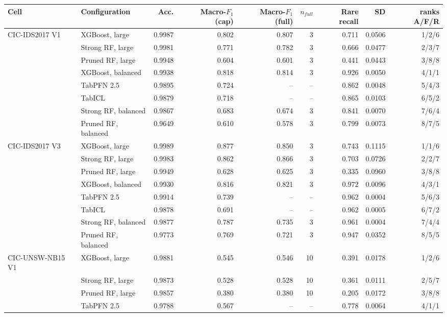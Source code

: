 \begin{tabular}{@{}llrrrrrrr@{}}
\toprule
Cell & Configuration & Acc. & Macro-$F_1$ (cap) & Macro-$F_1$ (full) & $n_{full}$ & Rare recall & SD & ranks A/F/R \\
\midrule
CIC-IDS2017 V1 & XGBoost, large & 0.9987 & 0.802 & 0.807 & 3 & 0.711 & 0.0506 & 1/2/6 \\
 & Strong RF, large & 0.9981 & 0.771 & 0.782 & 3 & 0.666 & 0.0477 & 2/3/7 \\
 & Pruned RF, large & 0.9948 & 0.604 & 0.601 & 3 & 0.441 & 0.0443 & 3/8/8 \\
 & XGBoost, balanced & 0.9938 & 0.818 & 0.814 & 3 & 0.926 & 0.0050 & 4/1/1 \\
 & TabPFN 2.5 & 0.9895 & 0.724 & -- & -- & 0.862 & 0.0048 & 5/4/3 \\
 & TabICL & 0.9879 & 0.718 & -- & -- & 0.865 & 0.0103 & 6/5/2 \\
 & Strong RF, balanced & 0.9867 & 0.683 & 0.674 & 3 & 0.841 & 0.0070 & 7/6/4 \\
 & Pruned RF, balanced & 0.9649 & 0.610 & 0.578 & 3 & 0.799 & 0.0073 & 8/7/5 \\
\addlinespace
CIC-IDS2017 V3 & XGBoost, large & 0.9989 & 0.877 & 0.850 & 3 & 0.743 & 0.1115 & 1/1/6 \\
 & Strong RF, large & 0.9983 & 0.862 & 0.866 & 3 & 0.703 & 0.0726 & 2/2/7 \\
 & Pruned RF, large & 0.9949 & 0.628 & 0.625 & 3 & 0.335 & 0.0960 & 3/8/8 \\
 & XGBoost, balanced & 0.9930 & 0.816 & 0.821 & 3 & 0.972 & 0.0096 & 4/3/1 \\
 & TabPFN 2.5 & 0.9914 & 0.739 & -- & -- & 0.962 & 0.0004 & 5/6/3 \\
 & TabICL & 0.9878 & 0.691 & -- & -- & 0.962 & 0.0005 & 6/7/2 \\
 & Strong RF, balanced & 0.9877 & 0.787 & 0.735 & 3 & 0.961 & 0.0004 & 7/4/4 \\
 & Pruned RF, balanced & 0.9773 & 0.769 & 0.721 & 3 & 0.947 & 0.0352 & 8/5/5 \\
\addlinespace
CIC-UNSW-NB15 V1 & XGBoost, large & 0.9881 & 0.545 & 0.546 & 10 & 0.391 & 0.0178 & 1/2/6 \\
 & Strong RF, large & 0.9873 & 0.528 & 0.528 & 10 & 0.361 & 0.0111 & 2/5/7 \\
 & Pruned RF, large & 0.9857 & 0.380 & 0.380 & 10 & 0.205 & 0.0172 & 3/8/8 \\
 & TabPFN 2.5 & 0.9788 & 0.567 & -- & -- & 0.778 & 0.0064 & 4/1/1 \\

\end{tabular}
